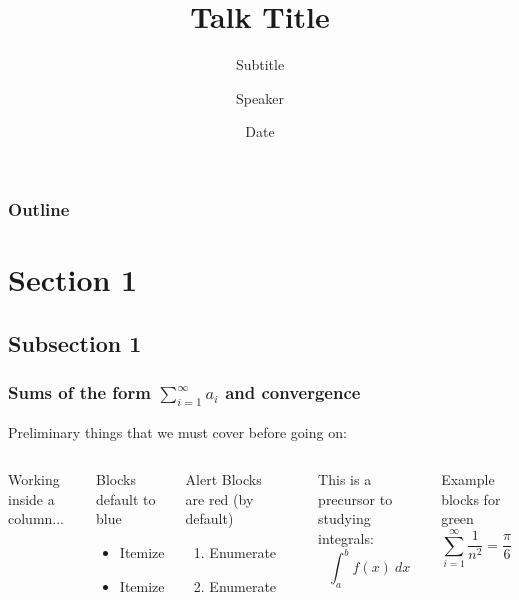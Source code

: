 \documentclass[notes]{beamer}
\title{Talk Title}
\subtitle{Subtitle}
\author{Speaker}
\institute{Institute}
\date{Date}
\def\defn#1{{\color{red} #1}}
\begin{document}
\begin{frame}
  \titlepage
\end{frame}

\begin{frame}
  \frametitle{Outline}
  \tableofcontents
\end{frame}

\section{Section 1}

\subsection{Subsection 1}

\begin{frame}
\frametitle{Sums of the form $\sum_{i=1}^\infty a_i$ and convergence}

Preliminary things that we must cover before going on:

\begin{columns}


Working inside a column...

\begin{block}{Blocks default to blue}
\begin{itemize}
\item Itemize
\item Itemize
\end{itemize}
\end{block}

\begin{alertblock}{Alert Blocks are red (by default)}
\begin{enumerate}
\item Enumerate
\item Enumerate
\end{enumerate}
\end{alertblock}


\hyperlink{post_equalities}{}

This is a precursor to studying \defn{integrals}:
\begin{equation*}
\int_a^b f(x)\ dx
\end{equation*}

\begin{exampleblock}{Example blocks for green}
\begin{equation}
\sum_{i=1}^\infty \frac1{n^2} = \frac\pi6
\end{equation}
\end{exampleblock}

\pause{}


\end{columns}

\end{frame}
\end{document}

